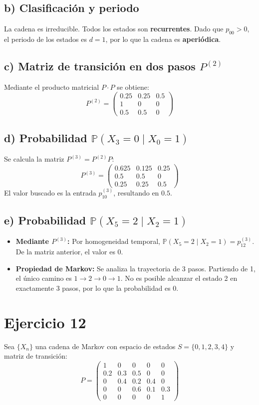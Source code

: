 \documentclass[letterpaper, 12pt]{article}
\begin{document}
    \subsection*{b) Clasificación y periodo}
    La cadena es irreducible. Todos los estados son \textbf{recurrentes}. Dado que $p_{00} > 0$, el periodo de los estados es $d=1$, por lo que la cadena es \textbf{aperiódica}.

    \subsection*{c) Matriz de transición en dos pasos $P^{(2)}$}
    Mediante el producto matricial $P \cdot P$ se obtiene:
    $$P^{(2)} = \begin{pmatrix} 0.25 & 0.25 & 0.5 \\ 1 & 0 & 0 \\ 0.5 & 0.5 & 0 \end{pmatrix}$$

    \subsection*{d) Probabilidad $\mathbb{P}(X_3 = 0 \mid X_0 = 1)$}
    Se calcula la matriz $P^{(3)} = P^{(2)} P$:
    $$P^{(3)} = \begin{pmatrix} 0.625 & 0.125 & 0.25 \\ 0.5 & 0.5 & 0 \\ 0.25 & 0.25 & 0.5 \end{pmatrix}$$
    El valor buscado es la entrada $p_{10}^{(3)}$, resultando en $0.5$.

    \subsection*{e) Probabilidad $\mathbb{P}(X_5 = 2 \mid X_2 = 1)$}
    \begin{itemize}
        \item \textbf{Mediante $P^{(3)}$:} Por homogeneidad temporal, $\mathbb{P}(X_5 = 2 \mid X_2 = 1) = p_{12}^{(3)}$. De la matriz anterior, el valor es $0$.
        \item \textbf{Propiedad de Markov:} Se analiza la trayectoria de 3 pasos. Partiendo de 1, el único camino es $1 \to 2 \to 0 \to 1$. No es posible alcanzar el estado 2 en exactamente 3 pasos, por lo que la probabilidad es $0$.
    \end{itemize}

    \newpage

    \section*{Ejercicio 12}
    Sea $\{X_n\}$ una cadena de Markov con espacio de estados $S = \{0, 1, 2, 3, 4\}$ y matriz de transición:
    \[
    P = \begin{pmatrix} 
    1 & 0 & 0 & 0 & 0 \\ 
    0.2 & 0.3 & 0.5 & 0 & 0 \\ 
    0 & 0.4 & 0.2 & 0.4 & 0 \\ 
    0 & 0 & 0.6 & 0.1 & 0.3 \\ 
    0 & 0 & 0 & 0 & 1 
    \end{pmatrix}
    \]
\end{document}
